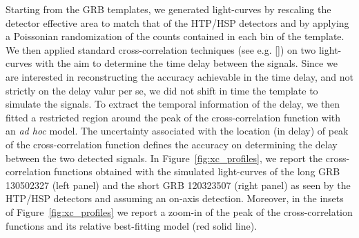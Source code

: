 \documentclass[]{spie}  %
\begin{document}
Starting from the GRB templates, we generated light-curves by rescaling the detector effective area to match that of the HTP/HSP detectors and by applying a Poissonian randomization of the counts contained in each bin of the template. We then applied standard cross-correlation techniques (see e.g. []) on two light-curves with the aim to determine the time delay between the signals. Since we are interested in reconstructing the accuracy achievable in the time delay, and not strictly on the delay valur per se, we did not shift in time the template to simulate the signals. To extract the temporal information of the delay, we then fitted a restricted region around the peak of the cross-correlation function with an \emph{ad hoc} model. The uncertainty associated with the location (in delay) of peak of the cross-correlation function defines the accuracy on determining the delay between the two detected signals. In Figure~\ref{fig:xc_profiles}, we report the cross-correlation functions obtained with the simulated light-curves of the long GRB 130502327 (left panel) and the short GRB 120323507 (right panel) as seen by the HTP/HSP detectors and assuming an on-axis detection. Moreover, in the insets of Figure~\ref{fig:xc_profiles} we report a zoom-in of the peak of the cross-correlation functions and its relative best-fitting model (red solid line).
	
\end{document}
